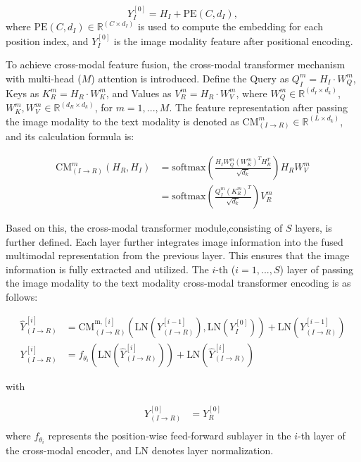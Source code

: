 \documentclass[preprint,12pt]{elsarticle}
\begin{document}
\begin{equation}
Y_I^{[0]} = H_I + \text{PE}(C, d_I),
\end{equation}
where $\text{PE}(C, d_I) \in \mathbb{R}^{(C \times d_I)}$ is used to compute the embedding for each position index, and $Y_I^{[0]}$ is the image modality feature after positional encoding.

To achieve cross-modal feature fusion, the cross-modal transformer mechanism with multi-head ($M$) attention is introduced. Define the Query as $Q_I^m = H_I \cdot W_Q^m$, Keys as $K_R^m = H_R \cdot W_K^m$, and Values as $V_R^m = H_R \cdot W_V^m$, where $W_Q^m \in \mathbb{R}^{(d_I \times d_k)}$, $W_K^m, W_V^m \in \mathbb{R}^{(d_R \times d_k)}$, for $m=1,...,M$. The feature representation after passing the image modality to the text modality is denoted as $\text{CM}_{(I \to R)}^m \in \mathbb{R}^{(L \times d_k)}$, and its calculation formula is:

\begin{equation}
\begin{aligned}
\text{CM}_{(I \to R)}^m (H_R, H_I) 
&= \text{softmax}\left(\frac{H_I W_Q^m (W_K^m)^T H_R^T}{\sqrt{d_k}}\right) H_R W_V^m \\
&= \text{softmax}\left(\frac{Q_I^m (K_R^m)^T}{\sqrt{d_k}}\right) V_R^m 
\end{aligned}
\end{equation}

Based on this, the cross-modal transformer module,consisting of $S$ layers, is further defined. Each layer further integrates image information into the fused multimodal representation from the previous layer. This ensures that the image information is fully extracted and utilized. The $i$-th ($i=1,...,S$) layer of passing the image modality to the text modality cross-modal transformer encoding is as follows:

\begin{equation}
\begin{aligned}
\hat{Y}_{(I \to R)}^{[i]} & = \text{CM}_{(I \to R)}^{\text{m},[i]}\left(\text{LN}(Y_{(I \to R)}^{[i-1]}), \text{LN}(Y_I^{[0]})\right) + \text{LN}(Y_{(I \to R)}^{[i-1]}) \\
Y_{(I \to R)}^{[i]} & = f_{\theta_i}\left(\text{LN}(\hat{Y}_{(I \to R)}^{[i]})\right) + \text{LN}(\hat{Y}_{(I \to R)}^{[i]}) 
\end{aligned}
\end{equation}

with

\begin{equation}
\begin{aligned}
Y_{(I \to R)}^{[0]} & = Y_R^{[0]} \\
\end{aligned}
\end{equation}
where $f_{\theta_i}$ represents the position-wise feed-forward sublayer in the $i$-th layer of the cross-modal encoder, and $\text{LN}$ denotes layer normalization.
\end{document}

